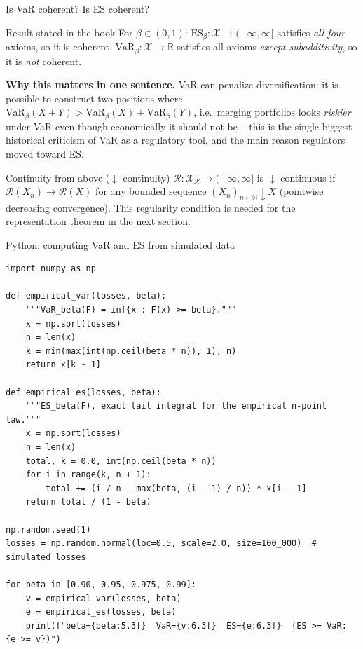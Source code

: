 \documentclass[aspectratio=169,10pt]{beamer}
\newcommand{\RR}{\mathbb{R}}
\newcommand{\1}{\mathbb{1}}
\begin{document}
\begin{frame}{Is VaR coherent? Is ES coherent?}

\begin{block}{Result stated in the book}
For $\beta \in (0,1)$: $\mathrm{ES}_\beta : \mathcal X \to (-\infty,\infty]$ satisfies \emph{all four} axioms, so it is coherent. $\mathrm{VaR}_\beta : \mathcal X \to \RR$ satisfies all axioms \emph{except subadditivity}, so it is \emph{not} coherent.
\end{block}

\textbf{Why this matters in one sentence.} VaR can penalize diversification: it is possible to construct two positions where $\mathrm{VaR}_\beta(X+Y) > \mathrm{VaR}_\beta(X) + \mathrm{VaR}_\beta(Y)$, i.e.\ merging portfolios looks \emph{riskier} under VaR even though economically it should not be -- this is the single biggest historical criticism of VaR as a regulatory tool, and the main reason regulators moved toward ES.

\vspace{2mm}
\begin{block}{Continuity from above ($\downarrow$-continuity)}
$\mathcal R: \mathcal X_{\mathcal R} \to (-\infty,\infty]$ is $\downarrow$-continuous if $\mathcal R(X_n) \to \mathcal R(X)$ for any bounded sequence $(X_n)_{n\in\mathbb N} \downarrow X$ (pointwise decreasing convergence). This regularity condition is needed for the representation theorem in the next section.
\end{block}

\end{frame}

\begin{frame}[fragile]{Python: computing VaR and ES from simulated data}

\begin{lstlisting}
import numpy as np

def empirical_var(losses, beta):
    """VaR_beta(F) = inf{x : F(x) >= beta}."""
    x = np.sort(losses)
    n = len(x)
    k = min(max(int(np.ceil(beta * n)), 1), n)
    return x[k - 1]

def empirical_es(losses, beta):
    """ES_beta(F), exact tail integral for the empirical n-point law."""
    x = np.sort(losses)
    n = len(x)
    total, k = 0.0, int(np.ceil(beta * n))
    for i in range(k, n + 1):
        total += (i / n - max(beta, (i - 1) / n)) * x[i - 1]
    return total / (1 - beta)

np.random.seed(1)
losses = np.random.normal(loc=0.5, scale=2.0, size=100_000)  # simulated losses

for beta in [0.90, 0.95, 0.975, 0.99]:
    v = empirical_var(losses, beta)
    e = empirical_es(losses, beta)
    print(f"beta={beta:5.3f}  VaR={v:6.3f}  ES={e:6.3f}  (ES >= VaR: {e >= v})")
\end{lstlisting}

\end{frame}
\end{document}
